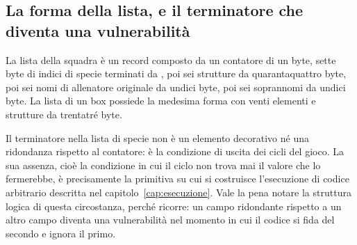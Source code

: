 \subsection{La forma della lista, e il terminatore che diventa una vulnerabilità}

La lista della squadra è un record composto da un contatore di un byte, sette byte di indici di specie terminati da , poi sei strutture da quarantaquattro byte, poi sei nomi di allenatore originale da undici byte, poi sei soprannomi da undici byte. La lista di un box possiede la medesima forma con venti elementi e strutture da trentatré byte.

Il terminatore  nella lista di specie non è un elemento decorativo né una ridondanza rispetto al contatore: è la condizione di uscita dei cicli del gioco. La sua assenza, cioè la condizione in cui il ciclo non trova mai il valore che lo fermerebbe, è precisamente la primitiva su cui si costruisce l'esecuzione di codice arbitrario descritta nel capitolo~\ref{cap:esecuzione}. Vale la pena notare la struttura logica di questa circostanza, perché ricorre: un campo ridondante rispetto a un altro campo diventa una vulnerabilità nel momento in cui il codice si fida del secondo e ignora il primo.

